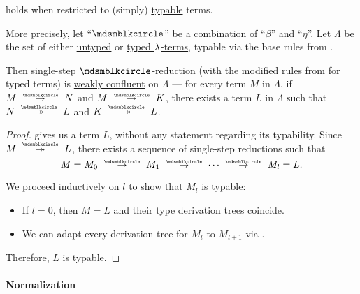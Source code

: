 \begin{proposition}\label{thm:simply_typed_church_rosser_theorem}
   holds when restricted to (simply) \hyperref[def:typability]{typable} terms.

  More precisely, let \enquote{\( {\Anon} \)} be a combination of \enquote{\( \beta \)} and \enquote{\( \eta \)}. Let \( \Lambda \) be the set of either \hyperref[def:lambda_term]{untyped} or \hyperref[def:typed_lambda_term]{typed \( \mathrm{\lambda} \)-terms}, typable via the base rules from .

  Then \hyperref[def:lambda_reduction/single]{single-step \( \Anon \)-reduction} (with the modified rules from  for typed terms) is \hyperref[def:reduction_confluence]{weakly confluent} on \( \Lambda \) --- for every term \( M \) in \( \Lambda \), if \( M \pred N \) and \( M \pred K \), there exists a term \( L \) in \( \Lambda \) such that \( N \pred* L \) and \( K \pred* L \).
\end{proposition}
\begin{proof}
   gives us a term \( L \), without any statement regarding its typability. Since \( M \pred* L \), there exists a sequence of single-step reductions such that
  \begin{equation*}
    M = M_0 \pred M_1 \pred \cdots \pred M_l = L.
  \end{equation*}

  We proceed inductively on \( l \) to show that \( M_l \) is typable:
  \begin{itemize}
    \item If \( l = 0 \), then \( M = L \) and their type derivation trees coincide.
    \item We can adapt every derivation tree for \( M_l \) to \( M_{l+1} \) via .
  \end{itemize}

  Therefore, \( L \) is typable.
\end{proof}

\paragraph{Normalization}


